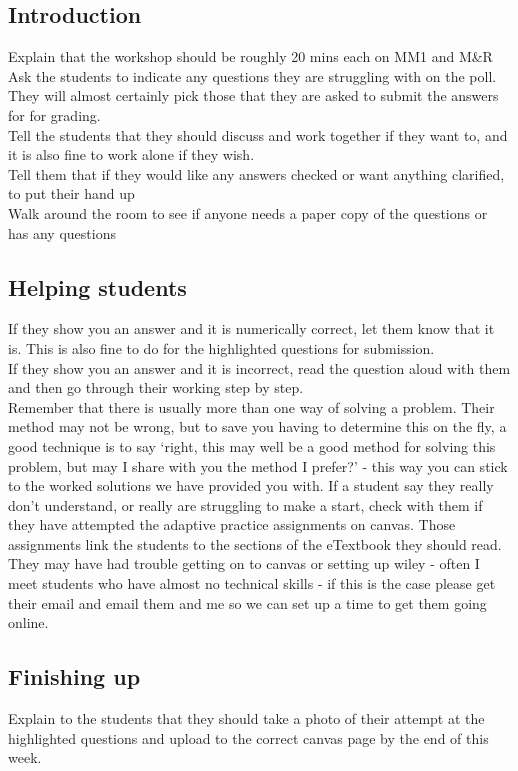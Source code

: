 \documentclass[11.5pt,sans,english]{article}
\begin{document}
\subsection{Introduction}
Explain that the workshop should be roughly 20 mins each on MM1 and M\&R\\
Ask the students to indicate any questions they are struggling with on the poll. They will almost certainly pick those that they are asked to submit the answers for for grading.\\
Tell the students that they should discuss and work together if they want to, and it is also fine to work alone if they wish.\\
Tell them that if they would like any answers checked or want anything clarified, to put their hand up\\
Walk around the room to see if anyone needs a paper copy of the questions or has any questions\\

\subsection{Helping students}
If they show you an answer and it is numerically correct, let them know that it is. This is also fine to do for the highlighted questions for submission.\\
If they show you an answer and it is incorrect, read the question aloud with them and then go through their working step by step.\\
Remember that there is usually more than one way of solving a problem. Their method may not be wrong, but to save you having to determine this on the fly, a good technique is to say `right, this may well be a good method for solving this problem, but may I share with you the method I prefer?' - this way you can stick to the worked solutions we have provided you with.
If a student say they really don't understand, or really are struggling to make a start, check with them if they have attempted the adaptive practice assignments on canvas. Those assignments link the students to the sections of the eTextbook they should read. They may have had trouble getting on to canvas or setting up wiley - often I meet students who have almost no technical skills - if this is the case please get their email and email them and me so we can set up a time to get them going online. \\

\subsection{Finishing up}
Explain to the students that they should take a photo of their attempt at the highlighted questions and upload to the correct canvas page by the end of this week.\\
\end{document}
